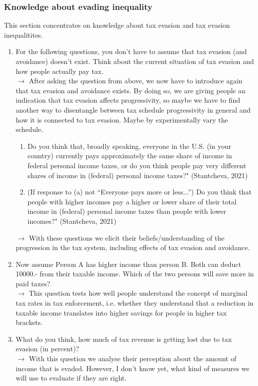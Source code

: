 \documentclass[12pt]{article}
\begin{document}
\subsubsection{Knowledge about evading inequality}
This section concentrates on knowledge about tax evasion and tax evasion inequalitites. 
\begin{enumerate}
    \item For the following questions, you don't have to assume that tax evasion (and avoidance) doesn't exist. Think about the current situation of tax evasion and how people actually pay tax.   \\
    $\rightarrow$ After asking the question from above, we now have to introduce again that tax evasion and avoidance exists. By doing so, we are giving people an indication that tax evasion affects progressivity, so maybe we have to find another way to disentangle between tax schedule progressivity in general and how it is connected to tax evasion. Maybe by experimentally vary the schedule. 
    \begin{enumerate}
        \item Do you think that, broadly speaking, everyone in the U.S. (in your country) currently pays approximately the same share of income in federal personal income taxes, or do you think people pay very different shares of income in (federal) personal income taxes?" (Stantcheva, 2021)
        \item (If response to (a) not “Everyone pays more or less...”) Do you think that people with higher incomes pay a higher or lower share of their total income in (federal) personal income taxes than people with lower incomes?" (Stantcheva, 2021)
    \end{enumerate} $\rightarrow$ With these questions we elicit their beliefs/understanding of the progression in the tax system, including effects of tax evasion and avoidance. 
    \item Now assume Person A has higher income than person B. Both can deduct 10000.- from their taxable income. Which of the two persons will save more in paid taxes? \\ $\rightarrow$ This question tests how well people understand the concept of marginal tax rates in tax enforcement, i.e. whether they understand that a reduction in taxable income translates into higher savings for people in higher tax brackets.
    \item What do you think, how much of tax revenue is getting lost due to tax evasion (in percent)? \\$\rightarrow$ With this question we analyse their perception about the amount of income that is evaded. However, I don't know yet, what kind of measures we will use to evaluate if they are right.

\end{enumerate}
\end{document}
